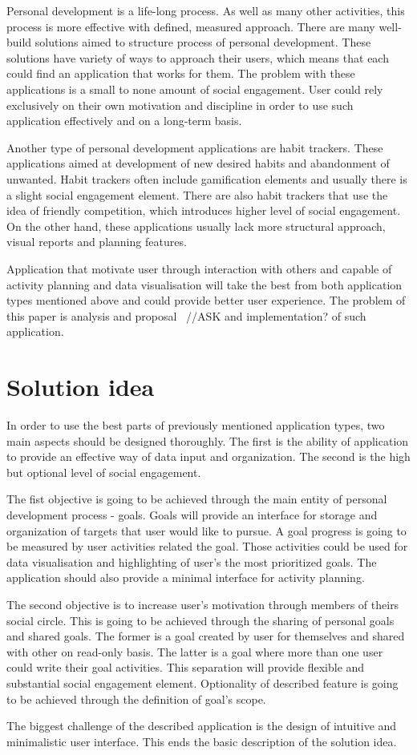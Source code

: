 Personal development is a life-long process.
As well as many other activities, this process is more effective with defined, measured approach.
There are many well-build solutions aimed to structure process of personal development.
These solutions have variety of ways to approach their users, which means that each could find an application that works for them.
The problem with these applications is a small to none amount of social engagement.
User could rely exclusively on their own motivation and discipline in order to use such application effectively and on a long-term basis.

Another type of personal development applications are habit trackers.
These applications aimed at development of new desired habits and abandonment of unwanted.
Habit trackers often include gamification elements and usually there is a slight social engagement element.
There are also habit trackers that use the idea of friendly competition, which introduces higher level of social engagement.
On the other hand, these applications usually lack more structural approach, visual reports and planning features.

Application that motivate user through interaction with others and capable of activity planning and data visualisation
will take the best from both application types mentioned above and could provide better user experience.
The problem of this paper is analysis and proposal ~{\color{gray}//ASK and implementation?} of such application.


\section{Solution idea}\label{sec:solution-idea}

In order to use the best parts of previously mentioned application types, two main aspects should be designed thoroughly.
The first is the ability of application to provide an effective way of data input and organization.
The second is the high but optional level of social engagement.

The fist objective is going to be achieved through the main entity of personal development process - goals.
Goals will provide an interface for storage and organization of targets that user would like to pursue.
A goal progress is going to be measured by user activities related the goal.
Those activities could be used for data visualisation and highlighting of user's the most prioritized goals.
The application should also provide a minimal interface for activity planning.

The second objective is to increase user's motivation through members of theirs social circle.
This is going to be achieved through the sharing of personal goals and shared goals.
The former is a goal created by user for themselves and shared with other on read-only basis.
The latter is a goal where more than one user could write their goal activities.
This separation will provide flexible and substantial social engagement element.
Optionality of described feature is going to be achieved through the definition of goal's scope.

The biggest challenge of the described application is the design of intuitive and minimalistic user interface.
This ends the basic description of the solution idea.
